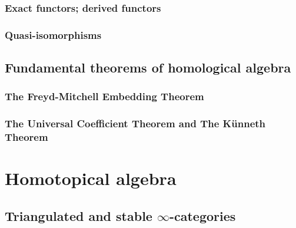        \subsubsection{Exact functors; derived functors}
        
        \subsubsection{Quasi-isomorphisms}
    
    \subsection{Fundamental theorems of homological algebra}
        \subsubsection{The Freyd-Mitchell Embedding Theorem}
        
        \subsubsection{The Universal Coefficient Theorem and The K\"unneth Theorem}

\section{Homotopical algebra} \label{section: homotopical_algebra}
    \subsection{Triangulated and stable \texorpdfstring{$\infty$}{}-categories}
